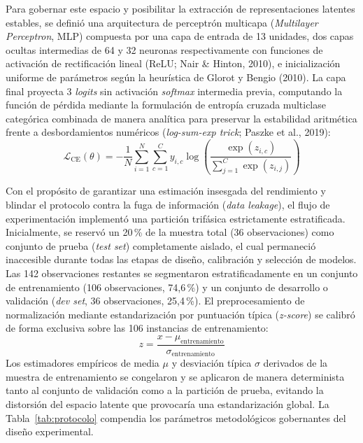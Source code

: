 \documentclass[12pt,letterpaper]{article}
\begin{document}
Para gobernar este espacio y posibilitar la extracción de representaciones latentes estables, se definió una arquitectura de perceptrón multicapa (\textit{Multilayer Perceptron}, MLP) compuesta por una capa de entrada de 13 unidades, dos capas ocultas intermedias de 64 y 32 neuronas respectivamente con funciones de activación de rectificación lineal (ReLU; Nair \& Hinton, 2010), e inicialización uniforme de parámetros según la heurística de Glorot y Bengio (2010). La capa final proyecta 3 \textit{logits} sin activación \textit{softmax} intermedia previa, computando la función de pérdida mediante la formulación de entropía cruzada multiclase categórica combinada de manera analítica para preservar la estabilidad aritmética frente a desbordamientos numéricos (\textit{log-sum-exp trick}; Paszke et al., 2019):
\begin{equation}
\mathcal{L}_{\text{CE}}(\theta) = -\frac{1}{N}\sum_{i=1}^{N} \sum_{c=1}^{C} y_{i,c} \log \left( \frac{\exp(z_{i,c})}{\sum_{j=1}^{C} \exp(z_{i,j})} \right)
\end{equation}

Con el propósito de garantizar una estimación insesgada del rendimiento y blindar el protocolo contra la fuga de información (\textit{data leakage}), el flujo de experimentación implementó una partición trifásica estrictamente estratificada. Inicialmente, se reservó un 20\,\% de la muestra total (36 observaciones) como conjunto de prueba (\textit{test set}) completamente aislado, el cual permaneció inaccesible durante todas las etapas de diseño, calibración y selección de modelos. Las 142 observaciones restantes se segmentaron estratificadamente en un conjunto de entrenamiento (106 observaciones, 74,6\,\%) y un conjunto de desarrollo o validación (\textit{dev set}, 36 observaciones, 25,4\,\%). El preprocesamiento de normalización mediante estandarización por puntuación típica (\textit{z-score}) se calibró de forma exclusiva sobre las 106 instancias de entrenamiento:
\begin{equation}
z = \frac{x - \mu_{\text{entrenamiento}}}{\sigma_{\text{entrenamiento}}}
\end{equation}
Los estimadores empíricos de media $\mu$ y desviación típica $\sigma$ derivados de la muestra de entrenamiento se congelaron y se aplicaron de manera determinista tanto al conjunto de validación como a la partición de prueba, evitando la distorsión del espacio latente que provocaría una estandarización global. La Tabla~\ref{tab:protocolo} compendia los parámetros metodológicos gobernantes del diseño experimental.
\end{document}
